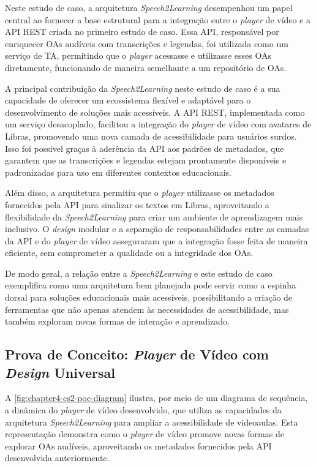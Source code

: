 Neste estudo de caso, a arquitetura \textit{Speech2Learning} desempenhou um papel central ao fornecer a base estrutural para a integração entre o \textit{player} de vídeo e a API REST criada no primeiro estudo de caso. Essa API, responsável por enriquecer OAs audíveis com transcrições e legendas, foi utilizada como um serviço de TA, permitindo que o \textit{player} acessasse e utilizasse esses OAs diretamente, funcionando de maneira semelhante a um repositório de OAs.

A principal contribuição da \textit{Speech2Learning} neste estudo de caso é a sua capacidade de oferecer um ecossistema flexível e adaptável para o desenvolvimento de soluções mais acessíveis. A API REST, implementada como um serviço desacoplado, facilitou a integração do \textit{player} de vídeo com avatares de Libras, promovendo uma nova camada de acessibilidade para usuários surdos. Isso foi possível graças à aderência da API aos padrões de metadados, que garantem que as transcrições e legendas estejam prontamente disponíveis e padronizadas para uso em diferentes contextos educacionais.

Além disso, a arquitetura permitiu que o \textit{player} utilizasse os metadados fornecidos pela API para sinalizar os textos em Libras, aproveitando a flexibilidade da \textit{Speech2Learning} para criar um ambiente de aprendizagem mais inclusivo. O \textit{design} modular e a separação de responsabilidades entre as camadas da API e do \textit{player} de vídeo asseguraram que a integração fosse feita de maneira eficiente, sem comprometer a qualidade ou a integridade dos OAs.

De modo geral, a relação entre a \textit{Speech2Learning} e este estudo de caso exemplifica como uma arquitetura bem planejada pode servir como a espinha dorsal para soluções educacionais mais acessíveis, possibilitando a criação de ferramentas que não apenas atendem às necessidades de acessibilidade, mas também exploram novas formas de interação e aprendizado.

\subsection{Prova de Conceito: \textit{Player} de Vídeo com \textit{Design} Universal}

A \autoref{fig:chapter4-cs2-poc-diagram} ilustra, por meio de um diagrama de sequência, a dinâmica do \textit{player} de vídeo desenvolvido, que utiliza as capacidades da arquitetura \textit{Speech2Learning} para ampliar a acessibilidade de videoaulas. Esta representação demonstra como o \textit{player} de vídeo promove novas formas de explorar OAs audíveis, aproveitando os metadados fornecidos pela API desenvolvida anteriormente.

